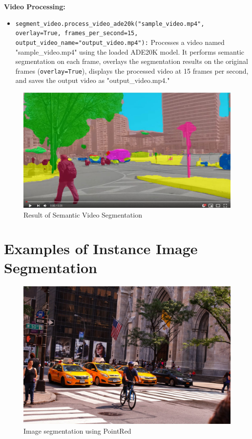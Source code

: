 \textbf{Video Processing:}
\begin{itemize}
    \item \texttt{segment\_video.process\_video\_ade20k("sample\_video.mp4", overlay=True, frames\_per\_second=15, output\_video\_name="output\_video.mp4"):} Processes a video named "sample\_video.mp4" using the loaded ADE20K model. It performs semantic segmentation on each frame, overlays the segmentation results on the original frames (\texttt{overlay=True}), displays the processed video at 15 frames per second, and saves the output video as "output\_video.mp4."
\end{itemize}
\begin{figure}[h!]
    \centering
    \includegraphics[width=0.8\linewidth]{Images/PixelLib/sem4.jpeg} %
    
    \caption{Result of Semantic Video Segmentation}
    \label{fig:your_image_label}
\end{figure}


\newpage

\section{Examples of Instance Image Segmentation}


\begin{figure}[h!]
    \centering
    \includegraphics[width=0.8\linewidth]{Images/PixelLib/seg.jpeg} %
    
    \caption{Image segmentation using PointRed}
    \label{fig:your_image_label}
    
    
\end{figure}
